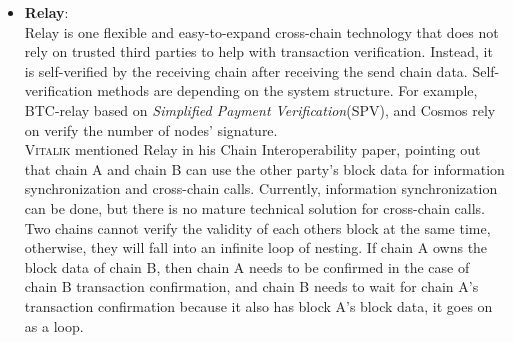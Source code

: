 \begin{itemize}
\begin{itemize}
\begin{figure}[H]
        \centering
        \caption{Distributed signature Notary Scheme diagram}%
        \centering
        \label{fig:dno}
        \end{figure}
        As Figure \ref{fig:dno} shows, distributed signature based on cryptography, the key point is that for cross-chain transactions, the system generates one and only one key, and no one in the notary group will have a complete key. The key is randomly sent to each notary node in the form of fragments.
        Meanwhile, the fragment is the processed ciphertext, so even if all the notaries put together the pieces, the complete key cannot be known, and the security of the key is fully guaranteed.
    \end{itemize}
    \item \textbf{Relay\cite{buterin2016chain}}:\\
    Relay is one flexible and easy-to-expand cross-chain technology that does not rely on trusted third parties to help with transaction verification. Instead, it is self-verified by the receiving chain after receiving the send chain data. Self-verification methods are depending on the system structure. For example, BTC-relay\cite{btc-relay} based on \textit{Simplified Payment Verification}(SPV), and Cosmos\cite{cosmos} rely on verify the number of nodes' signature.\\
    \textsc{Vitalik} mentioned Relay in his Chain Interoperability paper\cite{buterin2016chain}, pointing out that chain A and chain B can use the other party's block data for information synchronization and cross-chain calls. Currently, information synchronization can be done, but there is no mature technical solution for cross-chain calls. Two chains cannot verify the validity of each others block at the same time, otherwise, they will fall into an infinite loop of nesting. If chain A owns the block data of chain B, then chain A needs to be confirmed in the case of chain B transaction confirmation, and chain B needs to wait for chain A's transaction confirmation because it also has block A's block data, it goes on as a loop.
    
    
    

\end{itemize}
